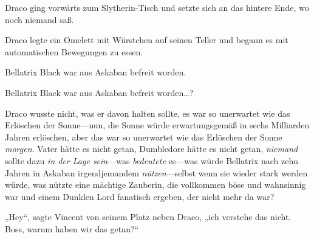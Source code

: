 Draco ging vorwärts zum Slytherin-Tisch und setzte sich an das hintere Ende, wo noch niemand saß.

Draco legte ein Omelett mit Würstchen auf seinen Teller und begann es mit automatischen Bewegungen zu essen.

Bellatrix Black war aus Askaban befreit worden.

Bellatrix Black war aus Askaban befreit worden…?

Draco wusste nicht, was er davon halten sollte, es war so unerwartet wie das Erlöschen der Sonne—nun, die Sonne würde erwartungsgemäß in sechs Milliarden Jahren erlöschen, aber das war so unerwartet wie das Erlöschen der Sonne \emph{morgen}. Vater hätte es nicht getan, Dumbledore hätte es nicht getan, \emph{niemand} sollte dazu \emph{in der Lage sein}—was \emph{bedeutete} es—was würde Bellatrix nach zehn Jahren in Askaban irgendjemandem \emph{nützen}—selbst wenn sie wieder stark werden würde, was nützte eine mächtige Zauberin, die vollkommen böse und wahnsinnig war und einem Dunklen Lord fanatisch ergeben, der nicht mehr da war?

„Hey“, sagte Vincent von seinem Platz neben Draco, „ich verstehe das nicht, Boss, warum haben wir das getan?“

